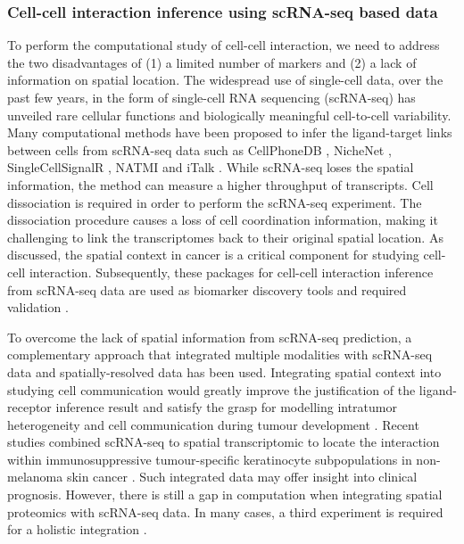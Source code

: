 \subsubsection{Cell-cell interaction inference using scRNA-seq based data}
To perform the computational study of cell-cell interaction, we need to address the two disadvantages of (1) a limited number of markers and (2) a lack of information on spatial location. The widespread use of single-cell data, over the past few years, in the form of single-cell RNA sequencing (scRNA-seq) has unveiled rare cellular functions and biologically meaningful cell-to-cell variability. Many computational methods have been proposed to infer the ligand-target links between cells from scRNA-seq data such as CellPhoneDB \cite{efremova2020cellphonedb}, NicheNet \cite{browaeys2020nichenet}, SingleCellSignalR \cite{cabello2020singlecellsignalr}, NATMI \cite{hou2020predicting} and iTalk \cite{wang2019italk}. While scRNA-seq loses the spatial information, the method can measure a higher throughput of transcripts. Cell dissociation is required in order to perform the scRNA-seq experiment. The dissociation procedure causes a loss of cell coordination information, making it challenging to link the transcriptomes back to their original spatial location. As discussed, the spatial context in cancer is a critical component for studying cell-cell interaction. Subsequently, these packages for cell-cell interaction inference from scRNA-seq data are used as biomarker discovery tools and required validation \cite{de2020unraveling}. 

To overcome the lack of spatial information from scRNA-seq prediction, a complementary approach that integrated multiple modalities with scRNA-seq data and spatially-resolved data has been used. Integrating spatial context into studying cell communication would greatly improve the justification of the ligand-receptor inference result and satisfy the grasp for modelling intratumor heterogeneity and cell communication during tumour development \cite{crosetto2015spatially, pages2010immune, marusyk2012intra,bedard2013tumour}. Recent studies combined scRNA-seq to spatial transcriptomic to locate the interaction within immunosuppressive tumour-specific keratinocyte subpopulations in non-melanoma skin cancer \cite{ji2020multimodal}. Such integrated data may offer insight into clinical prognosis. However, there is still a gap in computation when integrating spatial proteomics with scRNA-seq data. In many cases, a third experiment is required for a holistic integration \cite{ji2020multimodal, schulz2018simultaneous, govek2021single}.    

